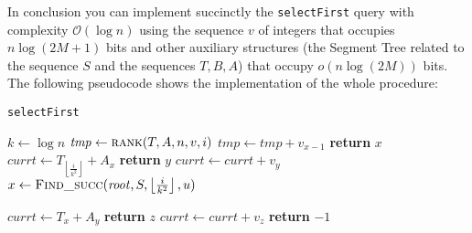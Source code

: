 \documentclass{article}
\begin{document}
In conclusion you can implement succinctly the \texttt{selectFirst} query with complexity $\mathcal{O}(\log{n})$ using the sequence $v$ of integers that occupies $n\log{(2M+1)}$ bits and other auxiliary structures (the Segment Tree related to the sequence $S$ and the sequences $T,B,A$) that occupy $o(n\log{(2M)})$ bits. The following pseudocode shows the implementation of the whole procedure:
    \begin{algorithm}
    \caption{\texttt{selectFirst}}\label{selectFirst} 
    \begin{algorithmic}[1]
     
        \State $k\gets\log{n}$
        \State $\mathit{tmp} \gets \Call{rank}{T,A,n,v,i}$ 
        \State
         
            \State $\mathit{tmp}\gets \mathit{tmp}+v_{x-1}$
                \State \textbf{return} $x$
            \EndIf
        \EndFor
        \State
                \State $\mathit{currt}\gets T_{\left\lfloor{\frac{i}{k^2}}\right\rfloor}+A_x$
                        \State \textbf{return} $y$
                    \EndIf
                    \State $\mathit{currt}\gets \mathit{currt}+v_y$
                \EndFor
            \EndIf
        \EndFor
        \State
        \State $x\gets \Call{Find\_succ}{\mathit{root},S,\left\lfloor{\frac{i}{k^2}}\right\rfloor,u}$ 
    \end{algorithmic}
    \end{algorithm}
    \begin{algorithm}
    \begin{algorithmic}[1]
                    \State $\mathit{currt}\gets T_x+A_y$
                            \State \textbf{return} $z$
                        \EndIf
                        \State $\mathit{currt}\gets \mathit{currt}+v_z$
                    \EndFor
                \EndIf
            \EndFor
        \EndIf
        \State \textbf{return} $-1$ 
    \EndProcedure
    \end{algorithmic}
    \end{algorithm}
    
\end{document}
